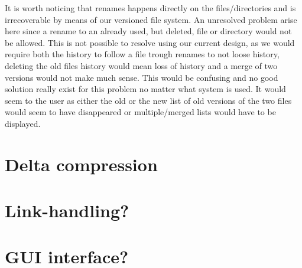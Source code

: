 \documentclass[12pt]{article}
\begin{document}
It is worth noticing that renames happens directly on the
files/directories and is irrecoverable by means of our versioned file
system. An unresolved problem arise here since a rename to an already
used, but deleted, file or directory would not be allowed. This is not
possible to resolve using our current design, as we would require both
the history to follow a file trough renames to not loose history,
deleting the old files history would mean loss of history and a merge
of two versions would not make much sense. This would be confusing and
no good solution really exist for this problem no matter what system
is used. It would seem to the user as either the old or the new list
of old versions of the two files would seem to have disappeared or
multiple/merged lists would have to be displayed.

\section{Delta compression}

\section{Link-handling?}

\section{GUI interface?}




 
\end{document}
